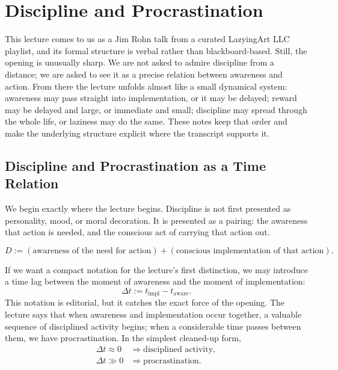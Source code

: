 \chapter{Discipline and Procrastination}

This lecture comes to us as a Jim Rohn talk from a curated LazyingArt LLC playlist, and its formal structure is verbal rather than blackboard-based. Still, the opening is unusually sharp. We are not asked to admire discipline from a distance; we are asked to see it as a precise relation between awareness and action. From there the lecture unfolds almost like a small dynamical system: awareness may pass straight into implementation, or it may be delayed; reward may be delayed and large, or immediate and small; discipline may spread through the whole life, or laziness may do the same. These notes keep that order and make the underlying structure explicit where the transcript supports it.

\section{Discipline and Procrastination as a Time Relation}

We begin exactly where the lecture begins. Discipline is not first presented as personality, mood, or moral decoration. It is presented as a pairing: the awareness that action is needed, and the conscious act of carrying that action out.

\begin{equation}
D := (\text{awareness of the need for action}) + (\text{conscious implementation of that action}).
\end{equation}

If we want a compact notation for the lecture's first distinction, we may introduce a time lag between the moment of awareness and the moment of implementation:
\begin{equation}
\Delta t := t_{\mathrm{impl}} - t_{\mathrm{aware}}.
\end{equation}
This notation is editorial, but it catches the exact force of the opening. The lecture says that when awareness and implementation occur together, a valuable sequence of disciplined activity begins; when a considerable time passes between them, we have procrastination. In the simplest cleaned-up form,
\begin{align}
\Delta t \approx 0 &\Rightarrow \text{disciplined activity}, \\
\Delta t \gg 0 &\Rightarrow \text{procrastination}.
\end{align}

